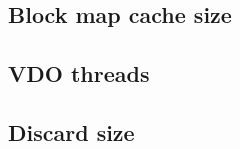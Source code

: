 \documentclass[
  color, %
  table, %
  lof,   %
  lot,   %
]{fithesis3}
\begin{document}
\subsection{Block map cache size}

\subsection{VDO threads}

\subsection{Discard size}








\end{document}
